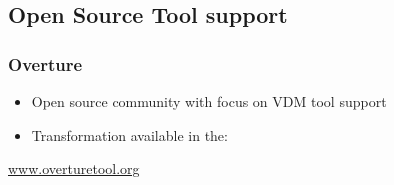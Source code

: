 \subsection{Open Source Tool support}
%
%
\frame
{
  \frametitle{Overture}
\begin{center}
  \begin{itemize}
  		\item Open source community with focus on VDM tool support
  		\item Transformation available in the:
  \end{itemize}
  
	\vspace{1cm}
  \LARGE {}

\vspace{2cm}
	\href{www.overturetool.org}{www.overturetool.org}
  

\end{center}
}

